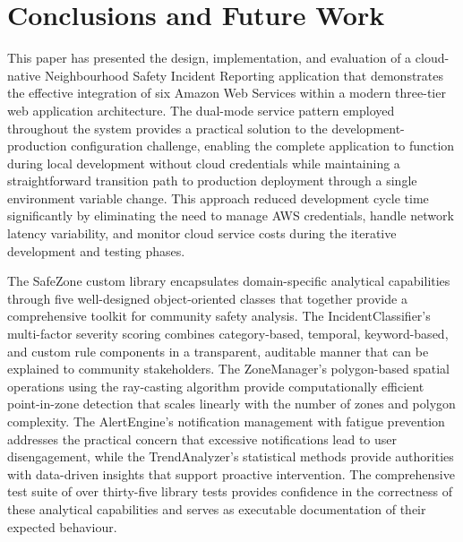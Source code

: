 \documentclass[conference]{IEEEtran}
\begin{document}
\section{Conclusions and Future Work}

This paper has presented the design, implementation, and evaluation of a cloud-native Neighbourhood Safety Incident Reporting application that demonstrates the effective integration of six Amazon Web Services within a modern three-tier web application architecture. The dual-mode service pattern employed throughout the system provides a practical solution to the development-production configuration challenge, enabling the complete application to function during local development without cloud credentials while maintaining a straightforward transition path to production deployment through a single environment variable change. This approach reduced development cycle time significantly by eliminating the need to manage AWS credentials, handle network latency variability, and monitor cloud service costs during the iterative development and testing phases.

The SafeZone custom library encapsulates domain-specific analytical capabilities through five well-designed object-oriented classes that together provide a comprehensive toolkit for community safety analysis. The IncidentClassifier's multi-factor severity scoring combines category-based, temporal, keyword-based, and custom rule components in a transparent, auditable manner that can be explained to community stakeholders. The ZoneManager's polygon-based spatial operations using the ray-casting algorithm provide computationally efficient point-in-zone detection that scales linearly with the number of zones and polygon complexity. The AlertEngine's notification management with fatigue prevention addresses the practical concern that excessive notifications lead to user disengagement, while the TrendAnalyzer's statistical methods provide authorities with data-driven insights that support proactive intervention. The comprehensive test suite of over thirty-five library tests provides confidence in the correctness of these analytical capabilities and serves as executable documentation of their expected behaviour.
\end{document}
